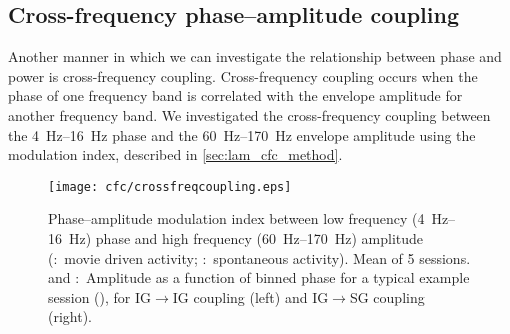 

\subsection{Cross-frequency phase--amplitude coupling}
\label{sec:lam_cfc}

Another manner in which we can investigate the relationship between phase and power is cross-frequency coupling.
Cross-frequency coupling occurs when the phase of one frequency band is correlated with the envelope amplitude for another frequency band.
We investigated the cross-frequency coupling between the \SIrange{4}{16}{Hz} phase and the \SIrange{60}{170}{Hz} envelope amplitude using the modulation index, described in \autoref{sec:lam_cfc_method}.

\begin{figure}[htbp]
\subfloat{\label{fig:lam_cfc_movie}}
\subfloat{\label{fig:lam_cfc_spont}}
\subfloat{\label{fig:lam_cfc_movie_traces}}
\subfloat{\label{fig:lam_cfc_spont_traces}}
\centerline{
\texttt{[image: cfc/crossfreqcoupling.eps]}
}
%
\caption{
Phase--amplitude modulation index between low frequency (\SIrange{4}{16}{Hz}) phase and high frequency (\SIrange{60}{170}{Hz}) amplitude (\protect{}:~movie driven activity; \protect{}:~spontaneous activity).
Mean of \num{5} sessions.
\protect{} and \protect{}:~Amplitude as a function of binned phase for a typical example session (), for \ac{IG}$\rightarrow$\ac{IG} coupling (left) and \ac{IG}$\rightarrow$\ac{SG} coupling (right).}%
\label{fig:lam_8}
%
\end{figure}

